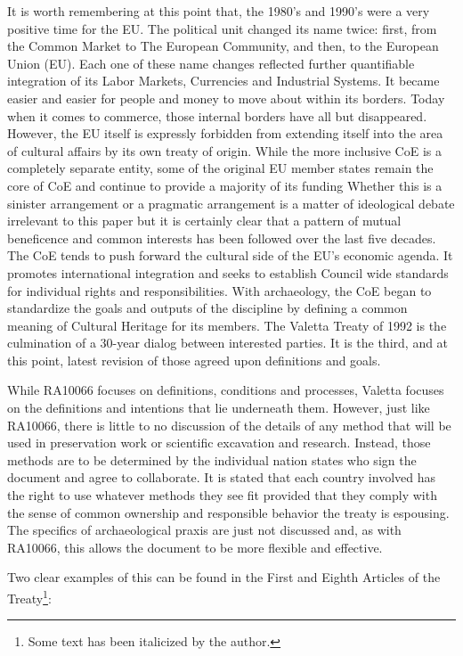 It is worth remembering at this point that, the 1980’s and 1990’s were a very positive time for the EU. The political unit changed its name twice: first, from the Common Market to The European Community, and then, to the European Union (EU). Each one of these name changes reflected further quantifiable integration of its Labor Markets, Currencies and Industrial Systems. It became easier and easier for people and money to move about within its borders. Today when it comes to commerce, those internal borders have all but disappeared. However, the EU itself is expressly forbidden from extending itself into the area of cultural affairs by its own treaty of origin. While the more inclusive CoE is a completely separate entity, some of the original EU member states remain the core of CoE and continue to provide a majority of its funding %
Whether this is a sinister arrangement or a pragmatic arrangement is a matter of ideological debate irrelevant to this paper but it is certainly clear that a pattern of mutual beneficence and common interests has been followed over the last five decades. The CoE tends to push forward the cultural side of the EU’s economic agenda. It promotes international integration and seeks to establish Council wide standards for individual rights and responsibilities. With archaeology, the CoE began to standardize the goals and outputs of the discipline by defining a common meaning of Cultural Heritage for its members. The Valetta Treaty of 1992 is the culmination of a 30-year dialog between interested parties. It is the third, and at this point, latest revision of those agreed upon definitions and goals. 

While RA10066 focuses on definitions, conditions and processes, Valetta focuses on the definitions and intentions that lie underneath them. However, just like RA10066, there is little to no discussion of the details of any method that will be used in preservation work or scientific excavation and research. Instead, those methods are to be determined by the individual nation states who sign the document and agree to collaborate. It is stated that each country involved has the right to use whatever methods they see fit provided that they comply with the sense of common ownership and responsible behavior the treaty is espousing. The specifics of archaeological praxis are just not discussed and, as with RA10066, this allows the document to be more flexible and effective. 

Two clear examples of this can be found in the First and Eighth Articles of the Treaty\footnote{Some text has been italicized by the author.}:

